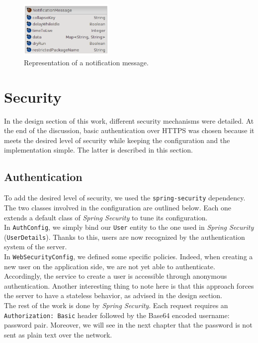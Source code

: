 \documentclass[a4paper, oneside, 11pt]{book}
\begin{document}
\begin{figure}[htbp]
	\centerline{\includegraphics[width=0.4\textwidth]{notif_message.png}}
	\caption{Representation of a notification message.}
	\label{fig:notif_message}
\end{figure}

\section{Security}
In the design section of this work, different security mechanisms were detailed. At the end of the discussion, basic authentication over HTTPS was chosen because it meets the desired level of security while keeping the configuration and the implementation simple. The latter is described in this section.

\subsection{Authentication}
To add the desired level of security, we used the \texttt{spring-security} dependency. The two classes involved in the configuration are outlined below. Each one extends a default class of \textit{Spring Security} to tune its configuration.\\ 

In \texttt{AuthConfig}, we simply bind our \texttt{User} entity to the one used in \textit{Spring Security} (\texttt{UserDetails}). Thanks to this, users are now recognized by the authentication system of the server. \\

In \texttt{WebSecurityConfig}, we defined some specific policies. Indeed, when creating a new user on the application side, we are not yet able to authenticate. Accordingly, the service to create a user is accessible through anonymous authentication. Another interesting thing to note here is that this approach forces the server to have a stateless behavior, as  advised in the design section.\\

The rest of the work is done by \textit{Spring Security}. Each request requires an \texttt{Authorization: Basic} header followed by the Base64 encoded username: password pair. Moreover, we will see in the next chapter that the password is not sent as plain text over the network.
\end{document}
